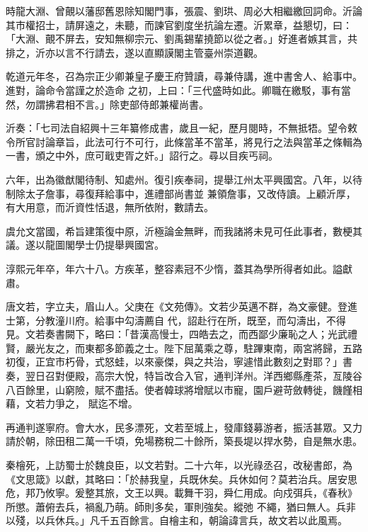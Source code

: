 \begin{pinyinscope}
 時龍大淵、曾覿以藩邸舊恩除知閣門事，張震、劉珙、周必大相繼繳回詞命。沂論其市權招士，請屏遠之，未聽，而諫官劉度坐抗論左遷。沂累章，益懇切，曰：「大淵、覿不屏去，安知無柳宗元、劉禹錫輩撓節以從之者。」好進者嫉其言，共排之，沂亦以言不行請去，遂以直顯謨閣主管臺州崇道觀。



 乾道元年冬，召為宗正少卿兼皇子慶王府贊讀，尋兼侍講，進中書舍人、給事中。進對，論命令當謹之於造命
 之初，上曰：「三代盛時如此。卿職在繳駁，事有當然，勿謂拂君相不言。」除吏部侍郎兼權尚書。



 沂奏：「七司法自紹興十三年纂修成書，歲且一紀，歷月閱時，不無抵牾。望令敕令所官討論章旨，此法可行不可行，此條當革不當革，將見行之法與當革之條輯為一書，頒之中外，庶可戢吏胥之奸。」詔行之。尋以目疾丐祠。



 六年，出為徽猷閣待制、知處州。復引疾奉祠，提舉江州太平興國宮。八年，以待制除太子詹事，尋復拜給事中，進禮部尚書並
 兼領詹事，又改侍讀。上顧沂厚，有大用意，而沂資性恬退，無所依附，數請去。



 虞允文當國，希旨建策復中原，沂極論金無畔，而我諸將未見可任此事者，數梗其議。遂以龍圖閣學士仍提舉興國宮。



 淳熙元年卒，年六十八。方疾革，整容素冠不少惰，蓋其為學所得者如此。謚獻肅。



 唐文若，字立夫，眉山人。父庚在《文苑傳》。文若少英邁不群，為文豪健。登進士第，分教潼川府。給事中勾濤薦自
 代，詔赴行在所，既至，而勾濤出，不得見。文若奏書闕下，略曰：「昔漢高慢士，四皓去之，而西鄙少廉恥之人；光武禮賢，嚴光友之，而東都多節義之士。陛下屈萬乘之尊，駐蹕東南，兩宮將歸，五路初復，正宜市朽骨，式怒蛙，以來豪傑，與之共治，寧遽惜此數刻之對耶？」書奏，翌日召對便殿，高宗大悅，特旨改合入官，通判洋州。洋西鄉縣產茶，亙陵谷八百餘里，山窮險，賦不盡括。使者韓球將增賦以市寵，園戶避苛斂轉徙，饑饉相藉，文若力爭之，
 賦迄不增。



 再通判遂寧府。會大水，民多漂死，文若至城上，發庫錢募游者，振活甚眾。又力請於朝，除田租二萬一千頃，免場務稅二十餘所，築長堤以捍水勢，自是無水患。



 秦檜死，上訪蜀士於魏良臣，以文若對。二十六年，以光祿丞召，改秘書郎，為《文思箴》以獻，其略曰：「於赫我皇，兵既休矣。兵休如何？莫若治兵。居安思危，邦乃攸寧。爰整其旅，文王以興。載舞干羽，舜仁用成。向戍弭兵，《春秋》所懲。蕭俯去兵，禍亂乃萌。師則多矣，軍則強矣。縱弛
 不繩，猶曰無人。兵非以殘，以兵休兵。」凡千五百餘言。自檜主和，朝論諱言兵，故文若以此風焉。




\end{pinyinscope}
